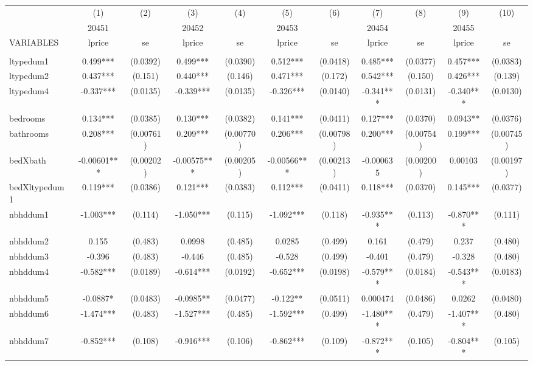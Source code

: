 \documentclass[]{article}
\begin{document}
\begin{tabular}{lcccccccccc} \hline
 & (1) & (2) & (3) & (4) & (5) & (6) & (7) & (8) & (9) & (10) \\
 & 20451 &  & 20452 &  & 20453 &  & 20454 &  & 20455 &  \\
VARIABLES & lprice & se & lprice & se & lprice & se & lprice & se & lprice & se \\ \hline
 &  &  &  &  &  &  &  &  &  &  \\
ltypedum1 & 0.499*** & (0.0392) & 0.499*** & (0.0390) & 0.512*** & (0.0418) & 0.485*** & (0.0377) & 0.457*** & (0.0383) \\
ltypedum2 & 0.437*** & (0.151) & 0.440*** & (0.146) & 0.471*** & (0.172) & 0.542*** & (0.150) & 0.426*** & (0.139) \\
ltypedum4 & -0.337*** & (0.0135) & -0.339*** & (0.0135) & -0.326*** & (0.0140) & -0.341*** & (0.0131) & -0.340*** & (0.0130) \\
bedrooms & 0.134*** & (0.0385) & 0.130*** & (0.0382) & 0.141*** & (0.0411) & 0.127*** & (0.0370) & 0.0943** & (0.0376) \\
bathrooms & 0.208*** & (0.00761) & 0.209*** & (0.00770) & 0.206*** & (0.00798) & 0.200*** & (0.00754) & 0.199*** & (0.00745) \\
bedXbath & -0.00601*** & (0.00202) & -0.00575*** & (0.00205) & -0.00566*** & (0.00213) & -0.000635 & (0.00200) & 0.00103 & (0.00197) \\
bedXltypedum1 & 0.119*** & (0.0386) & 0.121*** & (0.0383) & 0.112*** & (0.0411) & 0.118*** & (0.0370) & 0.145*** & (0.0377) \\
nbhddum1 & -1.003*** & (0.114) & -1.050*** & (0.115) & -1.092*** & (0.118) & -0.935*** & (0.113) & -0.870*** & (0.111) \\
nbhddum2 & 0.155 & (0.483) & 0.0998 & (0.485) & 0.0285 & (0.499) & 0.161 & (0.479) & 0.237 & (0.480) \\
nbhddum3 & -0.396 & (0.483) & -0.446 & (0.485) & -0.528 & (0.499) & -0.401 & (0.479) & -0.328 & (0.480) \\
nbhddum4 & -0.582*** & (0.0189) & -0.614*** & (0.0192) & -0.652*** & (0.0198) & -0.579*** & (0.0184) & -0.543*** & (0.0183) \\
nbhddum5 & -0.0887* & (0.0483) & -0.0985** & (0.0477) & -0.122** & (0.0511) & 0.000474 & (0.0486) & 0.0262 & (0.0480) \\
nbhddum6 & -1.474*** & (0.483) & -1.527*** & (0.485) & -1.592*** & (0.499) & -1.480*** & (0.479) & -1.407*** & (0.480) \\
nbhddum7 & -0.852*** & (0.108) & -0.916*** & (0.106) & -0.862*** & (0.109) & -0.872*** & (0.105) & -0.804*** & (0.105) \\

\end{tabular}
\end{document}
